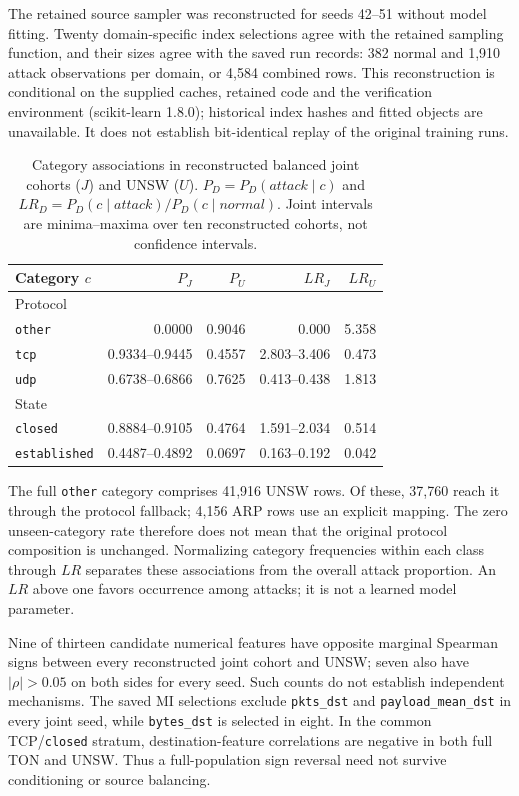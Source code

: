 The retained source sampler was reconstructed for seeds 42--51 without model fitting. Twenty domain-specific index selections agree with the retained sampling function, and their sizes agree with the saved run records: 382 normal and 1,910 attack observations per domain, or 4,584 combined rows. This reconstruction is conditional on the supplied caches, retained code and the verification environment (scikit-learn 1.8.0); historical index hashes and fitted objects are unavailable. It does not establish bit-identical replay of the original training runs.

\begin{table}[t]
\caption{Category associations in reconstructed balanced joint cohorts ($J$) and UNSW ($U$). $P_D=P_D(attack\mid c)$ and $LR_D=P_D(c\mid attack)/P_D(c\mid normal)$. Joint intervals are minima--maxima over ten reconstructed cohorts, not confidence intervals.}
\label{tab:unsw-category-shift}
\centering\scriptsize\setlength{\tabcolsep}{2.4pt}
\begin{tabular}{lrrrr}
\toprule
Category $c$ & $P_J$ & $P_U$ & $LR_J$ & $LR_U$\\
\midrule
\multicolumn{5}{l}{Protocol}\\
\texttt{other} & 0.0000 & 0.9046 & 0.000 & 5.358\\
\texttt{tcp} & 0.9334--0.9445 & 0.4557 & 2.803--3.406 & 0.473\\
\texttt{udp} & 0.6738--0.6866 & 0.7625 & 0.413--0.438 & 1.813\\
\midrule
\multicolumn{5}{l}{State}\\
\texttt{closed} & 0.8884--0.9105 & 0.4764 & 1.591--2.034 & 0.514\\
\texttt{established} & 0.4487--0.4892 & 0.0697 & 0.163--0.192 & 0.042\\
\bottomrule
\end{tabular}
\end{table}

The full \texttt{other} category comprises 41,916 UNSW rows. Of these, 37,760 reach it through the protocol fallback; 4,156 ARP rows use an explicit mapping. The zero unseen-category rate therefore does not mean that the original protocol composition is unchanged. Normalizing category frequencies within each class through $LR$ separates these associations from the overall attack proportion. An $LR$ above one favors occurrence among attacks; it is not a learned model parameter.

Nine of thirteen candidate numerical features have opposite marginal Spearman signs between every reconstructed joint cohort and UNSW; seven also have $|\rho|>0.05$ on both sides for every seed. Such counts do not establish independent mechanisms. The saved MI selections exclude \texttt{pkts\_dst} and \texttt{payload\_mean\_dst} in every joint seed, while \texttt{bytes\_dst} is selected in eight. In the common TCP/\texttt{closed} stratum, destination-feature correlations are negative in both full TON and UNSW. Thus a full-population sign reversal need not survive conditioning or source balancing.

